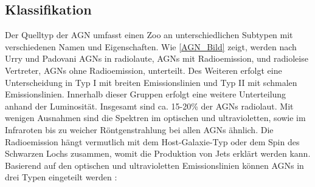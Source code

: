 \subsection{Klassifikation}
\label{subsec:Klassifikation}
Der Quelltyp der AGN umfasst einen Zoo an unterschiedlichen Subtypen mit verschiedenen Namen und Eigenschaften.
Wie \autoref{AGN_Bild} zeigt, werden nach Urry und Padovani \cite{Urry_Padovani} AGNs in radiolaute, AGNs mit Radioemission, und radioleise Vertreter, AGNs ohne Radioemission, unterteilt.
Des Weiteren erfolgt eine Unterscheidung in Typ I mit breiten Emissionslinien und Typ II mit schmalen Emissionslinien.
Innerhalb dieser Gruppen erfolgt eine weitere Unterteilung anhand der Luminosität.
Insgesamt sind ca. 15-20\% \cite{Urry_Padovani} der AGNs radiolaut.
Mit wenigen Ausnahmen sind die Spektren im optischen und ultravioletten, sowie im Infraroten bis zu weicher Röntgenstrahlung bei allen AGNs ähnlich.
Die Radioemission hängt vermutlich mit dem Host-Galaxie-Typ oder dem Spin des Schwarzen Lochs zusammen, womit die Produktion von Jets erklärt werden kann.
Basierend auf den optischen und ultravioletten Emissionslinien können AGNs in drei Typen eingeteilt werden \cite{Urry_Padovani}:

